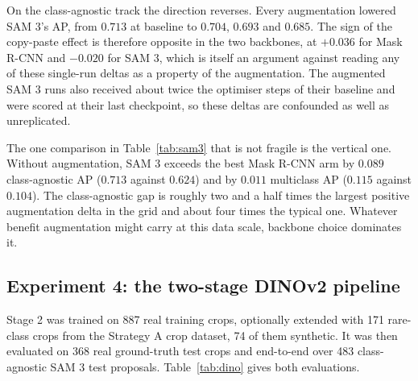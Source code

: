 On the class-agnostic track the direction reverses. Every augmentation lowered
SAM 3's AP, from $0.713$ at baseline to $0.704$, $0.693$ and $0.685$. The sign
of the copy-paste effect is therefore opposite in the two backbones, at $+0.036$
for Mask R-CNN and $-0.020$ for SAM 3, which is itself an argument against reading any of these single-run deltas as a property of the augmentation. The augmented SAM 3 runs also received about twice the optimiser steps of their baseline and were scored at their last checkpoint, so these deltas are confounded as well as unreplicated.

The one comparison in Table~\ref{tab:sam3} that is not fragile is the vertical
one. Without augmentation, SAM 3 exceeds the best Mask R-CNN arm by $0.089$
class-agnostic AP ($0.713$ against $0.624$) and by $0.011$ multiclass AP
($0.115$ against $0.104$). The class-agnostic gap is roughly two and a half
times the largest positive augmentation delta in the grid and about four times the typical one. Whatever benefit augmentation might carry at
this data scale, backbone choice dominates it.

\subsection*{Experiment 4: the two-stage DINOv2 pipeline}

Stage 2 was trained on 887 real training crops, optionally extended with 171 rare-class crops from the Strategy A crop dataset, 74 of them synthetic. It was then evaluated on
368 real ground-truth test crops and end-to-end over 483 class-agnostic SAM 3
test proposals. Table~\ref{tab:dino} gives both evaluations.

